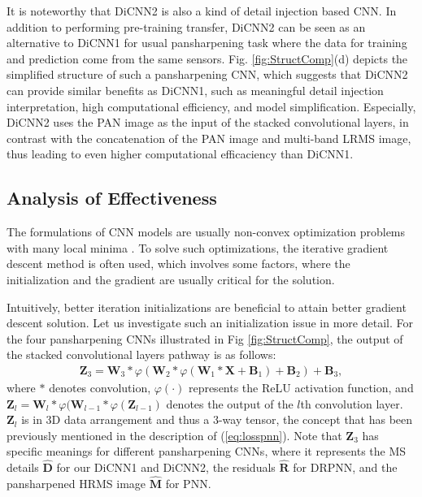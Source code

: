 \documentclass[journal]{IEEEtran}
\begin{document}
It is noteworthy that DiCNN2 is also a kind of detail injection based CNN. In addition to performing pre-training transfer, DiCNN2 can be seen as an alternative to DiCNN1 for usual pansharpening task where the data for training and prediction come from the same sensors. Fig. \ref{fig:StructComp}(d) depicts the simplified structure of such a pansharpening CNN, which suggests that DiCNN2 can provide similar benefits as DiCNN1, such as meaningful detail injection interpretation, high computational efficiency, and model simplification. Especially, DiCNN2 uses the PAN image as the input of the stacked convolutional layers, in contrast with the concatenation of the PAN image and multi-band LRMS image, thus leading to even higher computational efficaciency than DiCNN1.

\subsection{Analysis of Effectiveness}
The formulations of CNN models are usually non-convex optimization problems with many local minima \cite{choro2015loss,bottou2010large,haykin2009neural}. To solve such optimizations,  the iterative gradient descent method is often used, which involves some factors, where the initialization and the gradient are usually critical for the solution.

Intuitively, better iteration initializations are beneficial to attain better gradient descent solution. Let us investigate such an initialization issue in more detail. For the four pansharpening CNNs illustrated in Fig \ref{fig:StructComp}, the output of the stacked convolutional layers pathway is as follows:
\begin{equation}
\label{eq:finalout}
\begin{split}
\mathbf{Z}_3=\mathbf{W}_3*\varphi(\mathbf{W}_2*\varphi(\mathbf{W}_1*\mathbf{X}+\mathbf{B}_1)+\mathbf{B}_2)+\mathbf{B}_3,
\end{split}
\end{equation}
where $*$ denotes convolution, $\varphi(\cdot)$ represents the ReLU activation function, and $\mathbf{Z}_l=\mathbf{W}_l*\varphi(\mathbf{W}_{l-1}*\varphi(\mathbf{Z}_{l-1})$ denotes the output of the $l$th convolution layer. $\mathbf{Z}_l$ is in 3D data arrangement and thus a 3-way tensor, the concept that has been previously mentioned in the description of (\ref{eq:losspnn}). Note that $\mathbf{Z}_3$ has specific meanings for different pansharpening CNNs, where it represents the MS details $\widehat{\mathbf{D}}$ for our DiCNN1 and DiCNN2, the residuals $\widehat{\mathbf{R}}$ for DRPNN, and the pansharpened HRMS image $\widehat{\mathbf{M}}$ for PNN.
\end{document}
